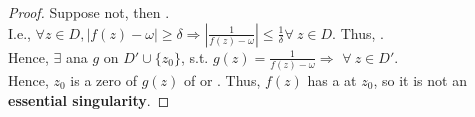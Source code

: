 \documentclass[12pt,a4paper]{article}
\begin{document}
\begin{proof}
  Suppose not, then . \\

  \noindent I.e., $\forall z \in D, |f(z) - \omega| \geq \delta \Rightarrow |\frac{1}{f(z) - \omega}| \leq \frac{1}{\delta} \forall\ z \in D$. Thus, . \\

  \noindent Hence, $\exists$ ana $g$ on $D' \cup \{z_0\}$, s.t. $g(z) = \frac{1}{f(z) - \omega} \Rightarrow$  $\forall\ z \in D'$. \\

  \noindent Hence, $z_0$ is a zero of $g(z)$ of  or . Thus, $f(z)$ has a  at $z_0$, so it is not an \textbf{essential singularity}.
\end{proof}
\end{document}
